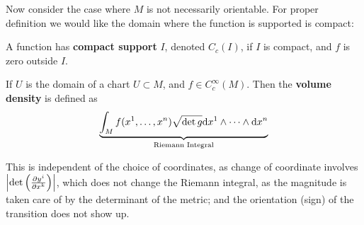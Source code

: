 \documentclass{article}
\begin{document}
Now consider the case where $M$ is not necessarily orientable. For proper definition we would like the domain where the function is supported is compact:
\begin{definition}
    A function has \textbf{compact support} $I$, denoted $C_c(I)$, if $I$ is compact, and $f$ is zero outside $I$.
\end{definition}
\nogap
\begin{definition}
    If $U$ is the domain of a chart $U \subset M$, and $f \in C_c^{\infty}(M)$. Then the \textbf{volume density} is defined as
    \[
        \underbrace{\int_M f(x^1, \dots, x^n) \sqrt{\det{g}} \mathrm{d} x^1 \wedge \cdots \wedge \mathrm{d} x^n}_{\text{Riemann Integral}}
    \]
\end{definition}
This is independent of the choice of coordinates, as change of coordinate involves $\left|\det\left( \frac{\partial y^i}{\partial x^k} \right)\right|$, which does not change the Riemann integral, as the magnitude is taken care of by the determinant of the metric; and the orientation (sign) of the transition does not show up.
\end{document}
